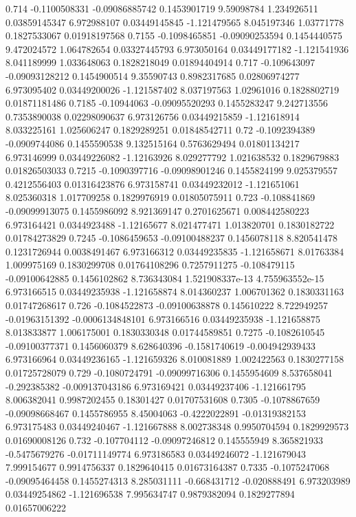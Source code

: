 {0.714 -0.1100508331 -0.09086885742 0.1453901719 9.59098784 1.234926511 0.03859145347 6.972988107 0.03449145845 -1.121479565 8.045197346 1.03771778 0.1827533067 0.01918197568
0.7155 -0.1098465851 -0.09090253594 0.1454440575 9.472024572 1.064782654 0.03327445793 6.973050164 0.03449177182 -1.121541936 8.041189999 1.033648063 0.1828218049 0.01894404914
0.717 -0.109643097 -0.09093128212 0.1454900514 9.35590743 0.8982317685 0.02806974277 6.973095402 0.03449200026 -1.121587402 8.037197563 1.02961016 0.1828802719 0.01871181486
0.7185 -0.10944063 -0.09095520293 0.1455283247 9.242713556 0.7353890038 0.02298090637 6.973126756 0.03449215859 -1.121618914 8.033225161 1.025606247 0.1829289251 0.01848542711
0.72 -0.1092394389 -0.0909744086 0.1455590538 9.132515164 0.5763629494 0.01801134217 6.973146999 0.03449226082 -1.12163926 8.029277792 1.021638532 0.1829679883 0.01826503033
0.7215 -0.1090397716 -0.09098901246 0.1455824199 9.025379557 0.4212556403 0.01316423876 6.973158741 0.03449232012 -1.121651061 8.025360318 1.017709258 0.1829976919 0.01805075911
0.723 -0.108841869 -0.09099913075 0.1455986092 8.921369147 0.2701625671 0.008442580223 6.973164421 0.0344923488 -1.12165677 8.021477471 1.013820701 0.1830182722 0.01784273829
0.7245 -0.1086459653 -0.09100488237 0.1456078118 8.820541478 0.1231726944 0.0038491467 6.973166312 0.03449235835 -1.121658671 8.01763384 1.009975169 0.1830299708 0.01764108296
0.7257911275 -0.108479115 -0.09100642885 0.1456102862 8.736343084 1.521908337e-13 4.755963552e-15 6.973166515 0.03449235938 -1.121658874 8.014360237 1.006701362 0.1830331163 0.01747268617
0.726 -0.1084522873 -0.09100638878 0.145610222 8.722949257 -0.01963151392 -0.0006134848101 6.973166516 0.03449235938 -1.121658875 8.013833877 1.006175001 0.1830330348 0.01744589851
0.7275 -0.1082610545 -0.09100377371 0.1456060379 8.628640396 -0.1581740619 -0.004942939433 6.973166964 0.03449236165 -1.121659326 8.010081889 1.002422563 0.1830277158 0.01725728079
0.729 -0.1080724791 -0.09099716306 0.1455954609 8.537658041 -0.292385382 -0.009137043186 6.973169421 0.03449237406 -1.121661795 8.006382041 0.9987202455 0.18301427 0.01707531608
0.7305 -0.1078867659 -0.09098668467 0.1455786955 8.45004063 -0.4222022891 -0.01319382153 6.973175483 0.03449240467 -1.121667888 8.002738348 0.9950704594 0.1829929573 0.01690008126
0.732 -0.107704112 -0.09097246812 0.145555949 8.365821933 -0.5475679276 -0.01711149774 6.973186583 0.03449246072 -1.121679043 7.999154677 0.9914756337 0.1829640415 0.01673164387
0.7335 -0.1075247068 -0.09095464458 0.1455274313 8.285031111 -0.668431712 -0.020888491 6.973203989 0.03449254862 -1.121696538 7.995634747 0.9879382094 0.1829277894 0.01657006222
}

